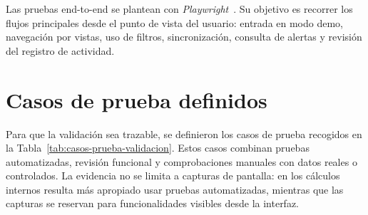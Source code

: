 Las pruebas end-to-end se plantean con \textit{Playwright}~\cite{PlaywrightDocs}. Su objetivo es recorrer los flujos principales desde el punto de vista del usuario: entrada en modo demo, navegación por vistas, uso de filtros, sincronización, consulta de alertas y revisión del registro de actividad.


\section{Casos de prueba definidos}

Para que la validación sea trazable, se definieron los casos de prueba recogidos en la Tabla~\ref{tab:casos-prueba-validacion}. Estos casos combinan pruebas automatizadas, revisión funcional y comprobaciones manuales con datos reales o controlados. La evidencia no se limita a capturas de pantalla: en los cálculos internos resulta más apropiado usar pruebas automatizadas, mientras que las capturas se reservan para funcionalidades visibles desde la interfaz.

